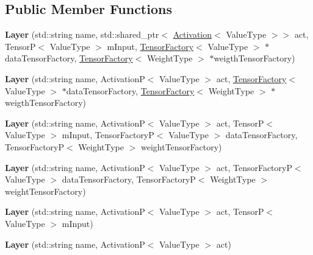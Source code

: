 \subsection*{Public Member Functions}
\begin{DoxyCompactItemize}
\item 
\mbox{\label{classLayer_ae51deecd48944b1e66aa3380346933ff}} 
{\bfseries Layer} (std\+::string name, std\+::shared\+\_\+ptr$<$ \hyperlink{classActivation}{Activation}$<$ Value\+Type $>$$>$ act, TensorP$<$ Value\+Type $>$ m\+Input, \hyperlink{classTensorFactory}{Tensor\+Factory}$<$ Value\+Type $>$ $\ast$data\+Tensor\+Factory, \hyperlink{classTensorFactory}{Tensor\+Factory}$<$ Weight\+Type $>$ $\ast$weigth\+Tensor\+Factory)
\item 
\mbox{\label{classLayer_aa364d0b9ba81ecf20e1311233e060194}} 
{\bfseries Layer} (std\+::string name, ActivationP$<$ Value\+Type $>$ act, \hyperlink{classTensorFactory}{Tensor\+Factory}$<$ Value\+Type $>$ $\ast$data\+Tensor\+Factory, \hyperlink{classTensorFactory}{Tensor\+Factory}$<$ Weight\+Type $>$ $\ast$weigth\+Tensor\+Factory)
\item 
\mbox{\label{classLayer_adc832dd81ee6309c08a1ed1dc50beceb}} 
{\bfseries Layer} (std\+::string name, ActivationP$<$ Value\+Type $>$ act, TensorP$<$ Value\+Type $>$ m\+Input, Tensor\+FactoryP$<$ Value\+Type $>$ data\+Tensor\+Factory, Tensor\+FactoryP$<$ Weight\+Type $>$ weight\+Tensor\+Factory)
\item 
\mbox{\label{classLayer_a9330e624400d416acf9db75e9ef341d5}} 
{\bfseries Layer} (std\+::string name, ActivationP$<$ Value\+Type $>$ act, Tensor\+FactoryP$<$ Value\+Type $>$ data\+Tensor\+Factory, Tensor\+FactoryP$<$ Weight\+Type $>$ weight\+Tensor\+Factory)
\item 
\mbox{\label{classLayer_ab54d3d87b93c96323b1b4b24696fedb1}} 
{\bfseries Layer} (std\+::string name, ActivationP$<$ Value\+Type $>$ act, TensorP$<$ Value\+Type $>$ m\+Input)
\item 
\mbox{\label{classLayer_a5b5fd9d3516b946740fe07798829beab}} 
{\bfseries Layer} (std\+::string name, ActivationP$<$ Value\+Type $>$ act)
\item 
\mbox{\label{classLayer_a65b01a9ea651eecfc1aa6b4d4a90934a}} 
$$
\end{DoxyCompactItemize}
